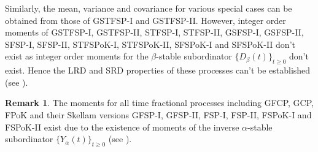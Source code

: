 \documentclass[11pt,oneside,reqno]{amsart}
\theoremstyle{definition}
\newtheorem{remark}{\bf Remark}[section]
\theoremstyle{remarkstyle}
\begin{document}
Similarly, the mean, variance and covariance for various special cases can be obtained from those of GSTFSP-I and GSTFSP-II. However, integer order moments of GSTFSP-I, GSTFSP-II, STFSP-I, STFSP-II, GSFSP-I, GSFSP-II, SFSP-I, SFSP-II, STFSPoK-I, STFSPoK-II, SFSPoK-I and SFSPoK-II don't exist as integer order moments for the $\beta$-stable subordinator $\{D_\beta(t)\}_{t\geq 0}$ don't exist. Hence the LRD and SRD properties of these processes can't be established (see \citet{Maheshwari2016}).
\begin{remark}
 The moments for all time fractional processes including GFCP, GCP, FPoK and their Skellam versions GFSP-I, GFSP-II, FSP-I, FSP-II, FSPoK-I and FSPoK-II exist due to the existence of moments of the inverse $\alpha$-stable subordinator $\{Y_\alpha(t)\}_{t\geq 0}$ (see \citet{Aletti2018}).   
\end{remark}
\end{document}
